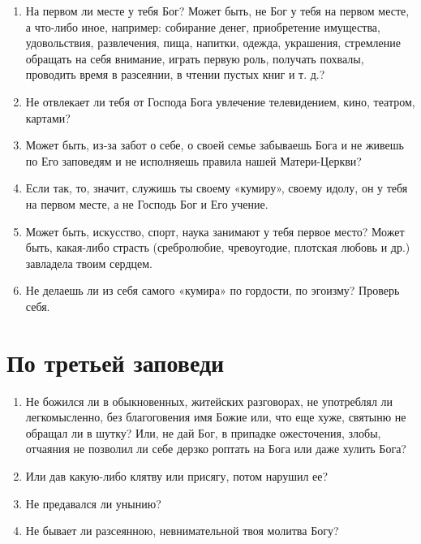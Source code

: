 \begin{mymulticols}

\begin{enumerate}

\item На первом ли месте у тебя Бог? Может быть, не Бог у тебя на первом месте, а что-либо иное, например: собирание денег, приобретение имущества, удовольствия, развлечения, пища, напитки, одежда, украшения, стремление обращать на себя внимание, играть первую роль, получать похвалы, проводить время в разсеянии, в чтении пустых книг и т. д.?

\item Не отвлекает ли тебя от Господа Бога увлечение телевидением, кино, театром, картами?

\item Может быть, из-за забот о себе, о своей семье забываешь Бога и не живешь по Его заповедям и не исполняешь правила нашей Матери-Церкви?

\item Если так, то, значит, служишь ты своему «кумиру», своему идолу, он у тебя на первом месте, а не Господь Бог и Его учение.

\item Может быть, искусство, спорт, наука занимают у тебя первое место? Может быть, какая-либо страсть (сребролюбие, чревоугодие, плотская любовь и др.) завладела твоим сердцем.

\item Не делаешь ли из себя самого «кумира» по гордости, по эгоизму? Проверь себя. 
\end{enumerate}

\end{mymulticols}

\section{По третьей заповеди}\nopagebreak

\begin{mymulticols}

\begin{enumerate}

\item Не божился ли в обыкновенных, житейских разговорах, не употреблял ли легкомысленно, без благоговения имя Божие или, что еще хуже, святыню не обращал ли в шутку? Или, не дай Бог, в припадке ожесточения, злобы, отчаяния не позволил ли себе дерзко роптать на Бога или даже хулить Бога?

\item Или дав какую-либо клятву или присягу, потом нарушил ее?

\item Не предавался ли унынию?

\item Не бывает ли разсеянною, невнимательной твоя молитва Богу? 
\end{enumerate}

\end{mymulticols}

